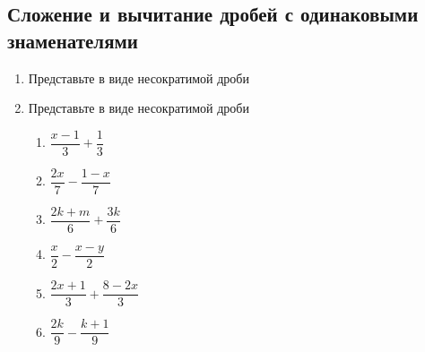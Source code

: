 \documentclass[10pt, a4paper]{article}
\begin{document}
\subsection{Сложение и вычитание дробей с одинаковыми знаменателями}
\begin{enumerate}
	\item Представьте в виде несократимой дроби
	\begin{multicols}{4}
		\begin{enumerate}
		\end{enumerate}	
	\end{multicols}
	\item Представьте в виде несократимой дроби
	\begin{multicols}{3}
		\begin{enumerate}
			\item $\dfrac{x-1}{3}+\dfrac{1}{3}$ 
			\item $\dfrac{2x}{7}-\dfrac{1-x}{7}$ 
			\item $\dfrac{2k+m}{6}+\dfrac{3k}{6}$ 
			\item $\dfrac{x}{2}-\dfrac{x-y}{2}$ 
			\item $\dfrac{2x+1}{3}+\dfrac{8-2x}{3}$ 
			\item $\dfrac{2k}{9}-\dfrac{k+1}{9}$ 

\end{enumerate}
\end{multicols}
\end{enumerate}
\end{document}
